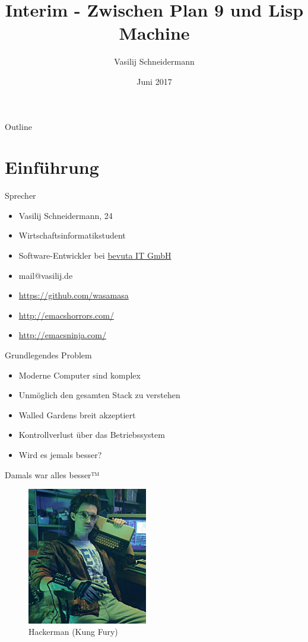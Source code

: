 \documentclass[presentation]{beamer}
\author{Vasilij Schneidermann}
\date{Juni 2017}
\title{Interim - Zwischen Plan 9 und Lisp Machine}
\begin{document}
\maketitle
\begin{frame}{Outline}
\tableofcontents
\end{frame}

\AtBeginSection{\frame{\sectionpage}}

\section{Einführung}
\label{sec-1}

\begin{frame}[label=sec-1-1]{Sprecher}
\begin{itemize}
\item Vasilij Schneidermann, 24
\item Wirtschaftsinformatikstudent
\item Software-Entwickler bei \href{https://www.bevuta.com/en/}{bevuta IT GmbH}
\item mail@vasilij.de
\item \url{https://github.com/wasamasa}
\item \url{http://emacshorrors.com/}
\item \url{http://emacsninja.com/}
\end{itemize}
\end{frame}

\begin{frame}[label=sec-1-2]{Grundlegendes Problem}
\begin{itemize}
\item Moderne Computer sind komplex
\item Unmöglich den gesamten Stack zu verstehen
\item Walled Gardens breit akzeptiert
\item Kontrollverlust über das Betriebssystem
\item Wird es jemals besser?
\end{itemize}
\end{frame}

\begin{frame}[label=sec-1-3]{Damals war alles besser™}
\begin{figure}[htb]
\centering
\includegraphics[height=6cm]{./images/hackerman.jpg}
\caption{Hackerman (Kung Fury)}
\end{figure}
\end{frame}
\end{document}
